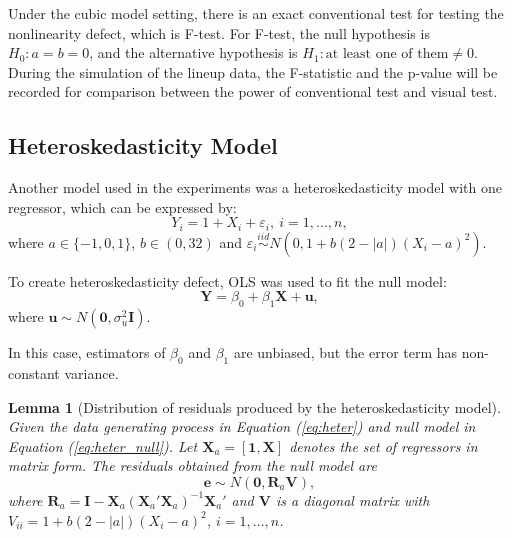 \documentclass{monashthesis}
\newtheorem{lemma}{Lemma}[chapter]
\theoremstyle{definition}
\theoremstyle{definition}
\theoremstyle{definition}
\theoremstyle{definition}
\theoremstyle{remark}
\begin{document}
Under the cubic model setting, there is an exact conventional test for testing the nonlinearity defect, which is F-test. For F-test, the null hypothesis is \(H_0:a=b=0\), and the alternative hypothesis is \(H_1:\text{at least one of them} \neq 0\). During the simulation of the lineup data, the F-statistic and the p-value will be recorded for comparison between the power of conventional test and visual test.

\hypertarget{heteroskedasticity-model}{%
\subsection{Heteroskedasticity Model}\label{heteroskedasticity-model}}

Another model used in the experiments was a heteroskedasticity model with one regressor, which can be expressed by:
\begin{equation} \label{eq:heter}
Y_i = 1 + X_i + \varepsilon_i, ~i = 1,...,n,
\end{equation}
where \(a \in \{-1,0,1\}\), \(b\in (0,32)\) and \(\varepsilon_i \overset{iid}{\sim} N(0,1+b(2-|a|)(X_i-a)^2)\).

To create heteroskedasticity defect, OLS was used to fit the null model:
\begin{equation} \label{eq:heter_null}
\boldsymbol{Y}=\beta_0+\beta_1\boldsymbol{X}+\boldsymbol{u},
\end{equation}
where \(\boldsymbol{u} \sim N(\boldsymbol{0}, \sigma^2_u\boldsymbol{I})\).

In this case, estimators of \(\beta_0\) and \(\beta_1\) are unbiased, but the error term has non-constant variance.

\begin{lemma}[Distribution of residuals produced by the heteroskedasticity model] \label{lemma:heter}
Given the data generating process in Equation (\ref{eq:heter}) and null model in Equation (\ref{eq:heter_null}). Let $\boldsymbol{X}_a=[\boldsymbol{1},\boldsymbol{X}]$ denotes the set of regressors in matrix form. The residuals obtained from the null model are $$\boldsymbol{e} \sim N(\boldsymbol{0}, \boldsymbol{R}_a\boldsymbol{V}),$$ where $\boldsymbol{R}_a=\boldsymbol{I}-\boldsymbol{X}_a(\boldsymbol{X}_a'\boldsymbol{X}_a)^{-1}\boldsymbol{X}_a'$ and $\boldsymbol{V}$ is a diagonal matrix with $V_{ii}=1+b(2-|a|)(X_i  -  a)^2$, $i = 1,...,n$. 
\end{lemma}
\end{document}
